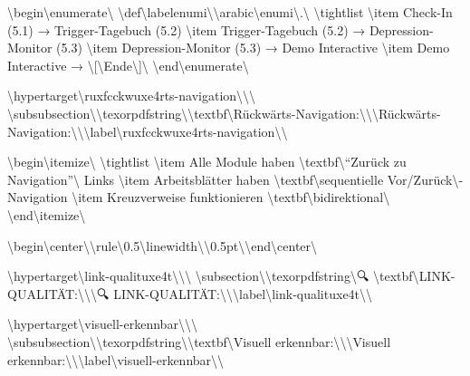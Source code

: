 \textbackslash{}begin\textbackslash{}{enumerate\textbackslash{}}
\textbackslash{}def\textbackslash{}labelenumi\textbackslash{}{\textbackslash{}arabic\textbackslash{}{enumi\textbackslash{}}.\textbackslash{}}
\textbackslash{}tightlist
\textbackslash{}item
  Check-In (5.1) → Trigger-Tagebuch (5.2)
\textbackslash{}item
  Trigger-Tagebuch (5.2) → Depression-Monitor (5.3)
\textbackslash{}item
  Depression-Monitor (5.3) → Demo Interactive
\textbackslash{}item
  Demo Interactive → \textbackslash{}{[\textbackslash{}}Ende\textbackslash{}{]\textbackslash{}}
\textbackslash{}end\textbackslash{}{enumerate\textbackslash{}}

\textbackslash{}hypertarget\textbackslash{}{ruxfcckwuxe4rts-navigation\textbackslash{}}\textbackslash{}{\textbackslash{}%
\textbackslash{}subsubsection\textbackslash{}{\textbackslash{}texorpdfstring\textbackslash{}{\textbackslash{}textbf\textbackslash{}{Rückwärts-Navigation:\textbackslash{}}\textbackslash{}}\textbackslash{}{Rückwärts-Navigation:\textbackslash{}}\textbackslash{}}\textbackslash{}label\textbackslash{}{ruxfcckwuxe4rts-navigation\textbackslash{}}\textbackslash{}}

\textbackslash{}begin\textbackslash{}{itemize\textbackslash{}}
\textbackslash{}tightlist
\textbackslash{}item
  Alle Module haben \textbackslash{}textbf\textbackslash{}{``Zurück zu Navigation''\textbackslash{}} Links
\textbackslash{}item
  Arbeitsblätter haben \textbackslash{}textbf\textbackslash{}{sequentielle Vor/Zurück\textbackslash{}}-Navigation
\textbackslash{}item
  Kreuzverweise funktionieren \textbackslash{}textbf\textbackslash{}{bidirektional\textbackslash{}}
\textbackslash{}end\textbackslash{}{itemize\textbackslash{}}

\textbackslash{}begin\textbackslash{}{center\textbackslash{}}\textbackslash{}rule\textbackslash{}{0.5\textbackslash{}linewidth\textbackslash{}}\textbackslash{}{0.5pt\textbackslash{}}\textbackslash{}end\textbackslash{}{center\textbackslash{}}

\textbackslash{}hypertarget\textbackslash{}{link-qualituxe4t\textbackslash{}}\textbackslash{}{\textbackslash{}%
\textbackslash{}subsection\textbackslash{}{\textbackslash{}texorpdfstring\textbackslash{}{🔍 \textbackslash{}textbf\textbackslash{}{LINK-QUALITÄT:\textbackslash{}}\textbackslash{}}\textbackslash{}{🔍 LINK-QUALITÄT:\textbackslash{}}\textbackslash{}}\textbackslash{}label\textbackslash{}{link-qualituxe4t\textbackslash{}}\textbackslash{}}

\textbackslash{}hypertarget\textbackslash{}{visuell-erkennbar\textbackslash{}}\textbackslash{}{\textbackslash{}%
\textbackslash{}subsubsection\textbackslash{}{\textbackslash{}texorpdfstring\textbackslash{}{\textbackslash{}textbf\textbackslash{}{Visuell erkennbar:\textbackslash{}}\textbackslash{}}\textbackslash{}{Visuell erkennbar:\textbackslash{}}\textbackslash{}}\textbackslash{}label\textbackslash{}{visuell-erkennbar\textbackslash{}}\textbackslash{}}

